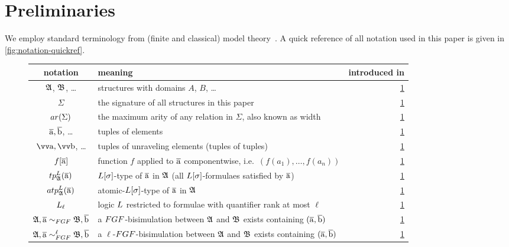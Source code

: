 
\section{Preliminaries}\label{sec:preliminaries}
We employ standard terminology from (finite and classical) model theory~\cite[Sec. 1--3]{Libkin04}.
A quick reference of all notation used in this paper is given in \cref{fig:notation-quickref}.

\begin{figure}
  \centering
  \bgroup
  \def\arraystretch{1.1}
  \begin{tabularx}{\textwidth}{c X r}
    notation & meaning & introduced in \\
    \hline
    ${\mathfrak{A}}$, ${\mathfrak{B}}$, \ldots & structures with domains $A$, $B$, \ldots & \cref{sec:preliminaries} \\
    $\Sigma$ & the signature of all structures in this paper & \cref{sec:preliminaries} \\
    $\arity(\Sigma)$ & the maximum arity of any relation in $\Sigma$, also known as width & \cref{sec:preliminaries} \\
    $\overline{\mathrm{a}}, \overline{\mathrm{b}}$, \ldots & tuples of elements & \cref{sec:preliminaries} \\
    $\elemtuptuplea, \elemtuptupleb$, \ldots & tuples of unraveling elements (tuples of tuples) & \cref{sec:preliminaries} \\
    $f[\overline{\mathrm{a}}]$ & function $f$ applied to $\overline{\mathrm{a}}$ componentwise, i.e.\ $(f(a_{1}), \ldots, f(a_{n}))$ & \cref{sec:preliminaries} \\
    $\tp{\logicL}{\str{A}}{\elemtuplea}$ & $\logicL[\sigma]$-type of $\overline{\mathrm{a}}$ in ${\mathfrak{A}}$ (all $\logicL[\sigma]$-formulaes satisfied by $\overline{\mathrm{a}}$) & \cref{sec:preliminaries} \\
    $\atp{\logicL}{\str{A}}{\elemtuplea}$ & atomic-$\logicL[\sigma]$-type of $\overline{\mathrm{a}}$ in ${\mathfrak{A}}$ & \cref{sec:preliminaries} \\
    $\logicL_{\ell}$ & logic $\logicL$ restricted to formulae with quantifier rank at most $\ell$ & \cref{sec:preliminaries} \\
    $\str{A}, \elemtuplea \bisimto_{\FGF} \str{B}, \elemtupleb$ & a $\FGF$-bisimulation between ${\mathfrak{A}}$ and ${\mathfrak{B}}$ exists containing $(\overline{\mathrm{a}}, \overline{\mathrm{b}})$ & \cref{sec:preliminaries} \\
    $\str{A}, \elemtuplea \bisimto_{\FGF}^{\ell} \str{B}, \elemtupleb$ & a $\ell$-$\FGF$-bisimulation between ${\mathfrak{A}}$ and ${\mathfrak{B}}$ exists containing $(\overline{\mathrm{a}}, \overline{\mathrm{b}})$ & \cref{sec:preliminaries} \\

\end{tabularx}
\end{figure}

